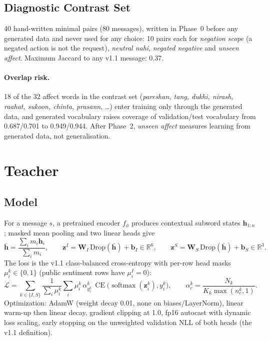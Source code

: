 \documentclass[11pt,a4paper]{article}
\theoremstyle{remark}
\newcommand{\hi}[1]{\textit{#1}}
\newcommand{\R}{\mathbb{R}}
\newcommand{\W}{\bm{W}}
\newcommand{\bb}{\bm{b}}
\newcommand{\z}{\bm{z}}
\DeclareMathOperator{\softmax}{softmax}
\DeclareMathOperator{\CE}{CE}
\begin{document}
\subsection{Diagnostic Contrast Set}
40 hand-written minimal pairs (80 messages), written in Phase~0 before any generated data and never used for any choice: 10 pairs each for \emph{negation scope} (a negated action is not the request), \emph{neutral nahi}, \emph{negated negative} and \emph{unseen affect}. Maximum Jaccard to any v1.1 message: 0.37.

\paragraph{Overlap risk.} 18 of the 32 affect words in the contrast set (\hi{pareshan, tang, dukhi, nirash, raahat, sukoon, chinta, prasann}, \dots) enter training only through the generated data, and generated vocabulary raises coverage of validation/test vocabulary from 0.687/0.701 to 0.949/0.944. After Phase~2, \emph{unseen affect} measures learning from generated data, not generalisation.

\section{Teacher}
\label{sec:teacher}

\subsection{Model}
For a message $s$, a pretrained encoder $f_\phi$ produces contextual subword states $\bm h_{1:n}$; masked mean pooling and two linear heads give
\begin{equation}
  \bar{\bm h} = \frac{\sum_{i} m_i \bm h_i}{\sum_i m_i},\qquad
  \z^{I} = \W_I\,\mathrm{Drop}(\bar{\bm h}) + \bb_I \in\R^{6},\qquad
  \z^{S} = \W_S\,\mathrm{Drop}(\bar{\bm h}) + \bb_S \in\R^{3}.
\end{equation}
The loss is the v1.1 class-balanced cross-entropy with per-row head masks $\mu^k_i\in\{0,1\}$ (public sentiment rows have $\mu^I_i=0$):
\begin{equation}
  \mathcal{L} = \sum_{k\in\{I,S\}} \frac{1}{\sum_i\mu^k_i}\sum_i \mu^k_i\,\alpha^k_{y^k_i}\,\CE\big(\softmax(\z^k_i), y^k_i\big),
  \qquad \alpha^k_c = \frac{N_k}{K_k\max(n^k_c,1)} .
\end{equation}
Optimization: AdamW (weight decay 0.01, none on biases/LayerNorm), linear warm-up then linear decay, gradient clipping at 1.0, fp16 autocast with dynamic loss scaling, early stopping on the unweighted validation NLL of both heads (the v1.1 definition).
\end{document}
